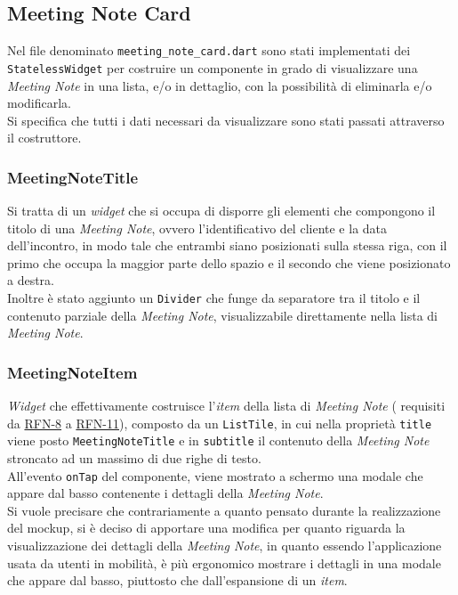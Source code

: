 \subsection{Meeting Note Card}
\label{subsec:meeting-note-card}

Nel file denominato \lstinline{meeting_note_card.dart} sono stati implementati dei \lstinline{StatelessWidget} per costruire un componente in grado di visualizzare una \emph{Meeting Note} in una lista, e/o in dettaglio, con la possibilità di eliminarla e/o modificarla. \\
Si specifica che tutti i dati necessari da visualizzare sono stati passati attraverso il costruttore.

\subsubsection*{MeetingNoteTitle}
\label{subsubsec:meeting-note-title}

Si tratta di un \emph{widget} che si occupa di disporre gli elementi che compongono il titolo di una 
\emph{Meeting Note}, ovvero l'identificativo del cliente e la data dell'incontro, in modo tale che entrambi siano posizionati sulla stessa riga, con il primo che occupa la maggior parte dello spazio e il secondo che viene posizionato a destra.\\
Inoltre è stato aggiunto un \lstinline{Divider}\cite{site:divider} che funge da separatore tra il titolo e il contenuto parziale della \emph{Meeting Note}, visualizzabile direttamente nella lista di \emph{Meeting Note}.

\subsubsection*{MeetingNoteItem}
\label{subsubsec:meeting-note-item}

\emph{Widget} che effettivamente costruisce l'\emph{item} della lista di \emph{Meeting Note} ( requisiti da \hyperref[RFN-8]{RFN-8} a \hyperref[RFN-11]{RFN-11}), composto da un \lstinline{ListTile}\cite{site:list-tile}, in cui nella proprietà \lstinline{title} viene posto \lstinline{MeetingNoteTitle} e in \lstinline{subtitle} il contenuto della \emph{Meeting Note} stroncato ad un massimo di due righe di testo.\\
All'evento \lstinline{onTap} del componente, viene mostrato a schermo una modale che appare dal basso contenente i dettagli della \emph{Meeting Note}.\\
Si vuole precisare che contrariamente a quanto pensato durante la realizzazione del \gls{mockup}\glsoccur, si è deciso di apportare una modifica per quanto riguarda la visualizzazione dei dettagli della \emph{Meeting Note}, in quanto essendo l'applicazione usata da utenti in mobilità, è più ergonomico mostrare i dettagli in una modale che appare dal basso, piuttosto che dall'espansione di un \emph{item}.

